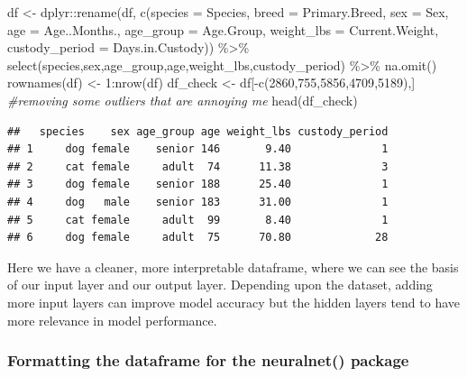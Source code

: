 \documentclass[
]{article}
\newenvironment{Shaded}{\begin{snugshade}}{\end{snugshade}}
\newcommand{\AttributeTok}[1]{\textcolor[rgb]{0.77,0.63,0.00}{#1}}
\newcommand{\CommentTok}[1]{\textcolor[rgb]{0.56,0.35,0.01}{\textit{#1}}}
\newcommand{\DecValTok}[1]{\textcolor[rgb]{0.00,0.00,0.81}{#1}}
\newcommand{\FunctionTok}[1]{\textcolor[rgb]{0.00,0.00,0.00}{#1}}
\newcommand{\NormalTok}[1]{#1}
\newcommand{\OtherTok}[1]{\textcolor[rgb]{0.56,0.35,0.01}{#1}}
\newcommand{\SpecialCharTok}[1]{\textcolor[rgb]{0.00,0.00,0.00}{#1}}
\begin{document}
\begin{Shaded}
\begin{Highlighting}[]
\NormalTok{df }\OtherTok{\textless{}{-}}\NormalTok{ dplyr}\SpecialCharTok{::}\FunctionTok{rename}\NormalTok{(df, }\FunctionTok{c}\NormalTok{(}\AttributeTok{species =}\NormalTok{ Species,}
                          \AttributeTok{breed =}\NormalTok{ Primary.Breed,}
                          \AttributeTok{sex =}\NormalTok{ Sex,}
                          \AttributeTok{age =}\NormalTok{ Age..Months.,}
                          \AttributeTok{age\_group =}\NormalTok{ Age.Group,}
                          \AttributeTok{weight\_lbs =}\NormalTok{ Current.Weight,}
                          \AttributeTok{custody\_period =}\NormalTok{ Days.in.Custody)) }\SpecialCharTok{\%\textgreater{}\%}
  \FunctionTok{select}\NormalTok{(species,sex,age\_group,age,weight\_lbs,custody\_period) }\SpecialCharTok{\%\textgreater{}\%} 
  \FunctionTok{na.omit}\NormalTok{()}
\FunctionTok{rownames}\NormalTok{(df) }\OtherTok{\textless{}{-}} \DecValTok{1}\SpecialCharTok{:}\FunctionTok{nrow}\NormalTok{(df)}
\NormalTok{df\_check }\OtherTok{\textless{}{-}}\NormalTok{ df[}\SpecialCharTok{{-}}\FunctionTok{c}\NormalTok{(}\DecValTok{2860}\NormalTok{,}\DecValTok{755}\NormalTok{,}\DecValTok{5856}\NormalTok{,}\DecValTok{4709}\NormalTok{,}\DecValTok{5189}\NormalTok{),] }\CommentTok{\#removing some outliers that are annoying me}
\FunctionTok{head}\NormalTok{(df\_check)}
\end{Highlighting}
\end{Shaded}

\begin{verbatim}
##   species    sex age_group age weight_lbs custody_period
## 1     dog female    senior 146       9.40              1
## 2     cat female     adult  74      11.38              3
## 3     dog female    senior 188      25.40              1
## 4     dog   male    senior 183      31.00              1
## 5     cat female     adult  99       8.40              1
## 6     dog female     adult  75      70.80             28
\end{verbatim}

Here we have a cleaner, more interpretable dataframe, where we can see
the basis of our input layer and our output layer. Depending upon the
dataset, adding more input layers can improve model accuracy but the
hidden layers tend to have more relevance in model performance.

\hypertarget{formatting-the-dataframe-for-the-neuralnet-package}{%
\subsubsection{Formatting the dataframe for the neuralnet()
package}\label{formatting-the-dataframe-for-the-neuralnet-package}}
\end{document}
